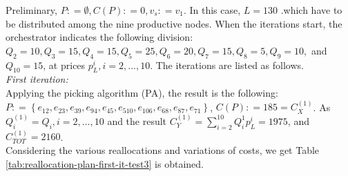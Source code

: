 Preliminary, $P : = \emptyset, C(P) : = 0, v_s : = v_1$. In this case, $L = 130$ .which have to be distributed among the nine productive nodes. When the iterations start, the orchestrator indicates the following division: $Q_2 = 10, Q_3 = 15, Q_4 = 15, Q_5 = 25, Q_6 = 20, Q_7 = 15, Q_8 = 5, Q_9 = 10,$ and $Q_10 = 15$, at prices $p_L^i , i=2,...,10$. The iterations are listed as follows.\\

\textit{First iteration:}\\
Applying the picking algorithm (PA), the result is the following: $P : = \left\{e_{12},e_{23}, e_{39}, e_{94}, e_{45}, e_{510}, e_{106}, e_{68}, e_{87}, e_{71} \right\}$, $C(P) : = 185 = C_X^{(1)}$. As $Q_i^{(1)} = Q_i, i=2,...,10$ and the result $C_Y^{(1)} = \sum^{10}_{i=2} Q_i^{1} p_L^i = 1975$, and $C_{TOT}^{(1)} = 2160$.\\
Considering the various reallocations and variations of costs, we get Table \ref{tab:reallocation-plan-first-it-test3} is obtained.

